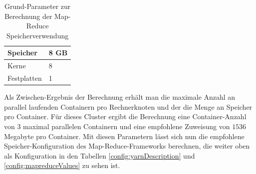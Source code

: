 \begin{table}
	\begin{tabularx}{\textwidth}{|X|X|} \hline
	Speicher & 8 GB \\ \hline
	Kerne & 8 \\ \hline
	Festplatten & 1 \\ \hline
	\end{tabularx}
	\caption{Grund-Parameter zur Berechnung der Map-Reduce Speicherverwendung}
	\label{config:memoryCalculation}
\end{table}

Als Zwischen-Ergebnis der Berechnung erhält man die maximale Anzahl an parallel laufenden 
Containern pro Rechnerknoten und der die Menge an Speicher pro Container. Für dieses Cluster
ergibt die Berechnung eine Container-Anzahl von $3$ maximal parallelen Containern und 
eine empfohlene Zuweisung von $1536$ Megabyte pro Container. Mit diesen Parametern lässt 
sich nun die empfohlene Speicher-Konfiguration des Map-Reduce-Frameworks berechnen, die
weiter oben als Konfiguration in den Tabellen \ref{config:yarnDescription} und
 \ref{config:mapreduceValues} zu sehen ist.